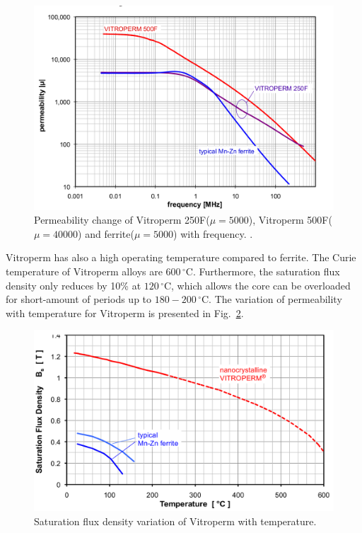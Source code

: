 \documentclass[a4paper, 11pt]{article} %
\begin{document}
\begin{figure}[]
  \centering
    \includegraphics[scale=0.3]{vitroperm500_250_permeability}
  \caption{Permeability change of Vitroperm 250F($\mu = 5000$), Vitroperm 500F($\mu = 40000$) and ferrite($\mu = 5000$) with frequency. \cite{vitroterm_manual}.}
  \label{vitroperm500_250_permeability}
\end{figure}


Vitroperm has also a high operating temperature compared to ferrite. The Curie temperature of Vitroperm alloys are $600\,^{\circ}\mathrm{C}$. Furthermore, the saturation flux density only reduces by 10\% at $120\,^{\circ}\mathrm{C}$, which allows the core can be overloaded for short-amount of periods up to $180-200 \,^{\circ}\mathrm{C}$. The variation of permeability with temperature for Vitroperm is presented in Fig.~\ref{temp_vs_saturation}.

\begin{figure}[]
  \centering
    \includegraphics[scale=0.3]{temp_vs_saturation}
  \caption{Saturation flux density variation of Vitroperm with temperature.}
  \label{temp_vs_saturation}
\end{figure}
\end{document}
